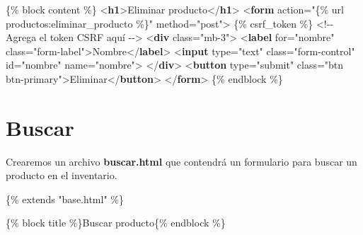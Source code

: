 \documentclass[
  a4paper,
  DIV=11,
  numbers=noendperiod,
  onepage,
  openany]{scrreprt}
\newenvironment{Shaded}{\begin{snugshade}}{\end{snugshade}}
\newcommand{\CommentTok}[1]{\textcolor[rgb]{0.37,0.37,0.37}{#1}}
\newcommand{\DataTypeTok}[1]{\textcolor[rgb]{0.68,0.00,0.00}{#1}}
\newcommand{\KeywordTok}[1]{\textcolor[rgb]{0.00,0.23,0.31}{\textbf{#1}}}
\newcommand{\NormalTok}[1]{\textcolor[rgb]{0.00,0.23,0.31}{#1}}
\newcommand{\OperatorTok}[1]{\textcolor[rgb]{0.37,0.37,0.37}{#1}}
\newcommand{\OtherTok}[1]{\textcolor[rgb]{0.00,0.23,0.31}{#1}}
\newcommand{\StringTok}[1]{\textcolor[rgb]{0.13,0.47,0.30}{#1}}
\begin{document}
\begin{tcolorbox}
\begin{Shaded}
\begin{Highlighting}[]
\NormalTok{\{\% block content \%\}}
\DataTypeTok{\textless{}}\KeywordTok{h1}\DataTypeTok{\textgreater{}}\NormalTok{Eliminar producto}\DataTypeTok{\textless{}/}\KeywordTok{h1}\DataTypeTok{\textgreater{}}
\DataTypeTok{\textless{}}\KeywordTok{form}\OtherTok{ action}\OperatorTok{=}\StringTok{"\{\% url \textquotesingle{}productos:eliminar\_producto\textquotesingle{} \%\}"}\OtherTok{ method}\OperatorTok{=}\StringTok{"post"}\DataTypeTok{\textgreater{}}
\NormalTok{    \{\% csrf\_token \%\}  }\CommentTok{\textless{}!{-}{-} Agrega el token CSRF aquí {-}{-}\textgreater{}}
    \DataTypeTok{\textless{}}\KeywordTok{div}\OtherTok{ class}\OperatorTok{=}\StringTok{"mb{-}3"}\DataTypeTok{\textgreater{}}
        \DataTypeTok{\textless{}}\KeywordTok{label}\OtherTok{ for}\OperatorTok{=}\StringTok{"nombre"}\OtherTok{ class}\OperatorTok{=}\StringTok{"form{-}label"}\DataTypeTok{\textgreater{}}\NormalTok{Nombre}\DataTypeTok{\textless{}/}\KeywordTok{label}\DataTypeTok{\textgreater{}}
        \DataTypeTok{\textless{}}\KeywordTok{input}\OtherTok{ type}\OperatorTok{=}\StringTok{"text"}\OtherTok{ class}\OperatorTok{=}\StringTok{"form{-}control"}\OtherTok{ id}\OperatorTok{=}\StringTok{"nombre"}\OtherTok{ name}\OperatorTok{=}\StringTok{"nombre"}\DataTypeTok{\textgreater{}}
    \DataTypeTok{\textless{}/}\KeywordTok{div}\DataTypeTok{\textgreater{}}
    \DataTypeTok{\textless{}}\KeywordTok{button}\OtherTok{ type}\OperatorTok{=}\StringTok{"submit"}\OtherTok{ class}\OperatorTok{=}\StringTok{"btn btn{-}primary"}\DataTypeTok{\textgreater{}}\NormalTok{Eliminar}\DataTypeTok{\textless{}/}\KeywordTok{button}\DataTypeTok{\textgreater{}}
\DataTypeTok{\textless{}/}\KeywordTok{form}\DataTypeTok{\textgreater{}}
\NormalTok{\{\% endblock \%\}}
\end{Highlighting}
\end{Shaded}

\section{Buscar}\label{buscar}

Crearemos un archivo \textbf{buscar.html} que contendrá un formulario
para buscar un producto en el inventario.

\begin{Shaded}
\begin{Highlighting}[]
\NormalTok{\{\% extends "base.html" \%\}}

\NormalTok{\{\% block title \%\}Buscar producto\{\% endblock \%\}}


\end{Highlighting}
\end{Shaded}
\end{tcolorbox}
\end{document}
